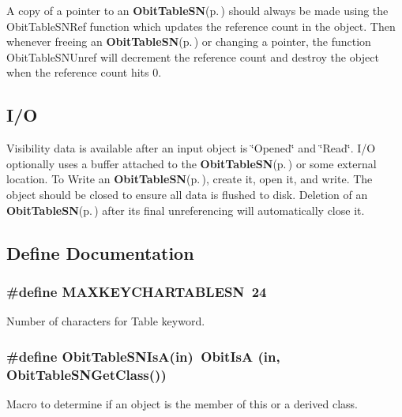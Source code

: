 A copy of a pointer to an {\bf Obit\-Table\-SN}{\rm (p.\,\pageref{structObitTableSN})} should always be made using the Obit\-Table\-SNRef function which updates the reference count in the object. Then whenever freeing an {\bf Obit\-Table\-SN}{\rm (p.\,\pageref{structObitTableSN})} or changing a pointer, the function Obit\-Table\-SNUnref will decrement the reference count and destroy the object when the reference count hits 0.\subsection{I/O}\label{ObitTableSN_8h_ObitTableSNUsage}
Visibility data is available after an input object is \char`\"{}Opened\char`\"{} and \char`\"{}Read\char`\"{}. I/O optionally uses a buffer attached to the {\bf Obit\-Table\-SN}{\rm (p.\,\pageref{structObitTableSN})} or some external location. To Write an {\bf Obit\-Table\-SN}{\rm (p.\,\pageref{structObitTableSN})}, create it, open it, and write. The object should be closed to ensure all data is flushed to disk. Deletion of an {\bf Obit\-Table\-SN}{\rm (p.\,\pageref{structObitTableSN})} after its final unreferencing will automatically close it.

\subsection{Define Documentation}
\subsubsection{\setlength{\rightskip}{0pt plus 5cm}\#define MAXKEYCHARTABLESN\ 24}\label{ObitTableSN_8h_a0}


Number of characters for Table keyword. 

\subsubsection{\setlength{\rightskip}{0pt plus 5cm}\#define Obit\-Table\-SNIs\-A(in)\ Obit\-Is\-A (in, Obit\-Table\-SNGet\-Class())}\label{ObitTableSN_8h_a3}


Macro to determine if an object is the member of this or a derived class. 

